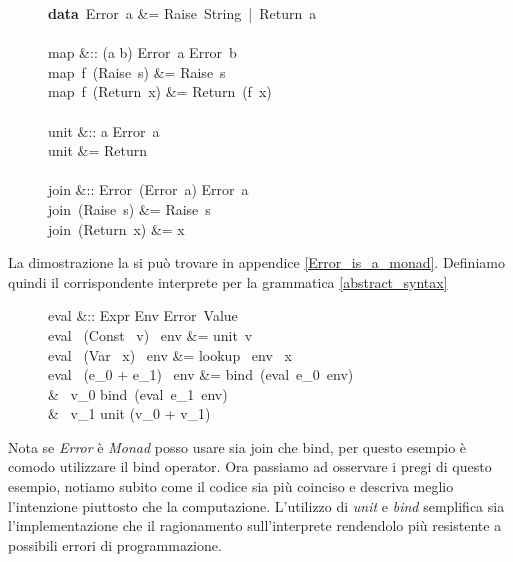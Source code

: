 \begin{figure}[H]
  \centering
  \footnotesize %
  \begin{haskellsyntax}
  \textbf{data}\ Error\ a &= Raise\ String\ |\ Return\ a \\\\

  map &:: (a \to b) \to Error\ a \to Error\ b\\
  map\ f\ (Raise\ s) &= Raise\ s\\
  map\ f\ (Return\ x) &= Return\ (f\ x)\\\\

  unit &:: a \to Error\ a\\
  unit &= Return\\\\

  join &:: Error\ (Error\ a) \to Error\ a\\
  join\ (Raise\ s) &= Raise\ s\\
  join\ (Return\ x) &= x
  \end{haskellsyntax}%
\end{figure}
La dimostrazione la si può trovare in appendice \ref{Error_is_a_monad}.
Definiamo quindi il corrispondente interprete per la grammatica
\ref{abstract_syntax}
\begin{figure}[H]
  \centering
  \footnotesize %
  \begin{haskellsyntax}
  eval &:: Expr \to Env \to Error\ Value\\
  eval \ (Const \ v) \ env &= unit\ v\\
  eval \ (Var \ x) \ env   &= lookup \ env \ x\\
  eval \ (e_0 + e_1) \ env &= bind\ (eval\ e_0\ env)\\
                           & \qquad \lambda\ v_0 \to bind\ (eval\ e_1\ env)\\
                           & \qquad \qquad \lambda\ v_1 \to unit (v_0 + v_1)
  \end{haskellsyntax}%
\end{figure}
Nota se \textit{Error }è \textit{Monad} posso usare sia join che bind,
per questo esempio è comodo utilizzare il bind operator.
Ora passiamo ad osservare i pregi di questo esempio, notiamo subito come il
codice sia più coinciso e descriva meglio l'intenzione piuttosto che la
computazione.
L'utilizzo di \textit{unit} e \textit{bind} semplifica sia l'implementazione che
il ragionamento sull'interprete rendendolo più resistente a possibili errori di
programmazione.

